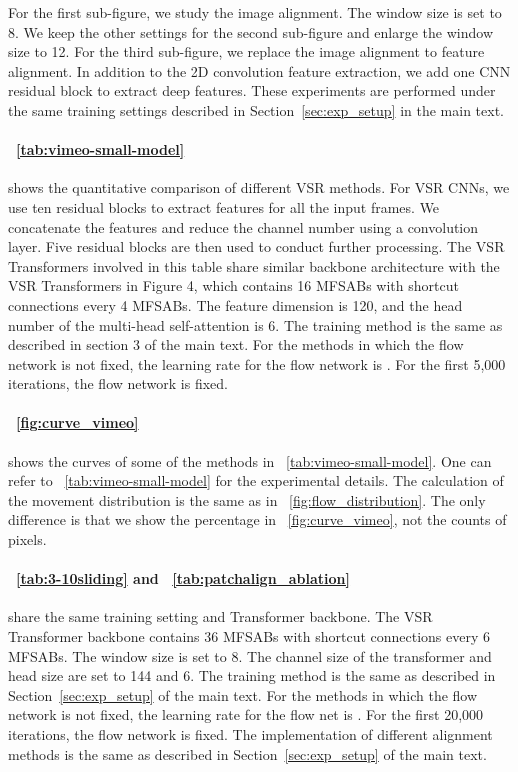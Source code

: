 \documentclass{article}
\begin{document}
For the first sub-figure, we study the image alignment.
The window size is set to 8.
We keep the other settings for the second sub-figure and enlarge the window size to 12.
For the third sub-figure, we replace the image alignment to feature alignment.
In addition to the 2D convolution feature extraction, we add one CNN residual block to extract deep features.
These experiments are performed under the same training settings described in Section~\ref{sec:exp_setup} in the main text.

\vspace{-3mm}
\paragraph{\tablename~\ref{tab:vimeo-small-model}}
shows the quantitative comparison of different VSR methods.
For VSR CNNs, we use ten residual blocks \cite{lim2017enhanced} to extract features for all the input frames.
We concatenate the features and reduce the channel number using a convolution layer.
Five residual blocks are then used to conduct further processing.
The VSR Transformers involved in this table share similar backbone architecture with the VSR Transformers in Figure 4, which contains 16 MFSABs with shortcut connections every 4 MFSABs.
The feature dimension is 120, and the head number of the multi-head self-attention is 6.
The training method is the same as described in section 3 of the main text.
For the methods in which the flow network is not fixed, the learning rate for the flow network is .
For the first 5,000 iterations, the flow network is fixed.

\vspace{-3mm}
\paragraph{\figurename~\ref{fig:curve_vimeo}}
shows the curves of some of the methods in \tablename~\ref{tab:vimeo-small-model}.
One can refer to \tablename~\ref{tab:vimeo-small-model} for the experimental details.
The calculation of the movement distribution is the same as in \figurename~\ref{fig:flow_distribution}.
The only difference is that we show the percentage in \figurename~\ref{fig:curve_vimeo}, not the counts of pixels.

\vspace{-3mm}
\paragraph{\tablename~\ref{tab:3-10sliding} and \tablename~\ref{tab:patchalign_ablation}}
share the same training setting and Transformer backbone.
The VSR Transformer backbone contains 36 MFSABs with shortcut connections every 6 MFSABs.
The window size is set to 8.
The channel size of the transformer and head size are set to 144 and 6.
The training method is the same as described in Section~\ref{sec:exp_setup} of the main text.
For the methods in which the flow network is not fixed, the learning rate for the flow net is .
For the first 20,000 iterations, the flow network is fixed.
The implementation of different alignment methods is the same as described in Section~\ref{sec:exp_setup} of the main text.
\end{document}
